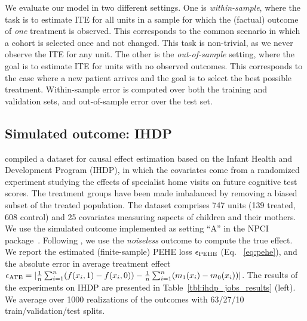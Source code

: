 
We evaluate our model in two different settings. One is \emph{within-sample}, where the task is to estimate ITE for all units in a sample for which the (factual) outcome of \emph{one} treatment is observed. This corresponds to the common scenario in which a cohort is selected once and not changed. This task is non-trivial, as we never observe the ITE for any unit. The other is the \emph{out-of-sample} setting, where the goal is to estimate ITE for units with no observed outcomes. This corresponds to the case where a new patient arrives and the goal is to select the best possible treatment. Within-sample error is computed over both the training and validation sets, and out-of-sample error over the test set.

\vskip -7pt
\subsection{Simulated outcome: IHDP}\vskip -5pt
\citet{hill2011bayesian} compiled a dataset for causal effect estimation based on the Infant Health and Development Program (IHDP), in which the covariates come from a randomized experiment studying the effects of specialist home visits on future cognitive test scores. The treatment groups have been made imbalanced by removing a biased subset of the treated population. The dataset comprises 747 units (139 treated, 608 control) and 25 covariates measuring aspects of children and their mothers. We use the simulated outcome implemented as setting ``A'' in the NPCI package~\citep{npci}. Following \citet{hill2011bayesian}, we use the \emph{noiseless} outcome to compute the true effect. We report the estimated (finite-sample) PEHE loss $\epsilon_{\text{PEHE}}$ (Eq. ~\ref{eq:pehe}), and the absolute error in average treatment effect $\epsilon_{\text{ATE}} = |\frac{1}{n}\sum_{i=1}^n (f(x_i, 1) - f(x_i, 0)) - \frac{1}{n}\sum_{i=1}^n (m_1(x_i) - m_0(x_i))|$.
The results of the experiments on IHDP are presented in Table~\ref{tbl:ihdp_jobs_results} (left). We average over 1000 realizations of the outcomes with 63/27/10 train/validation/test splits.

